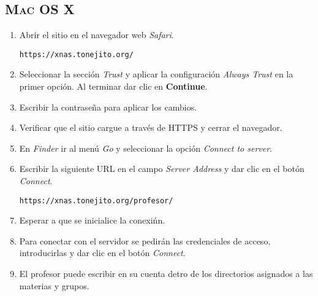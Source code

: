       \subsection {\textsc{Mac OS X}}

{
\linespread{0.1}
\begin{enumerate}

  \item Abrir el sitio en el navegador web \textsl{Safari}.

    \texttt{https://xnas.tonejito.org/}


  \item Seleccionar la secci\'{o}n \textit{Trust} y aplicar la configuraci\'{o}n \textsl{Always Trust} en la primer opci\'{o}n. Al terminar dar clic en \textbf{Continue}.


  \item Escribir la contrase\~{n}a para aplicar los cambios.


  \item Verificar que el sitio cargue a trav\'{e}s de \textsc{HTTPS} y cerrar el navegador.


  \item En \textsl{Finder} ir al men\'{u} \textsl{Go} y seleccionar la opci\'{o}n \textsl{Connect to server}.


  \item Escribir la siguiente \textsc{URL} en el campo \textsl{Server Address} y dar clic en el bot\'{o}n \textsl{Connect}.

    \texttt{https://xnas.tonejito.org/profesor/}


  \item Esperar a que se inicialice la conexi\'{n}n.


  \item Para conectar con el servidor se pedir\'{a}n las credenciales de acceso, introducirlas y dar clic en el bot\'{o}n \textsl{Connect}.


  \item El profesor puede escribir en su cuenta detro de los directorios asignados a las materias y grupos.


\end{enumerate}
}

